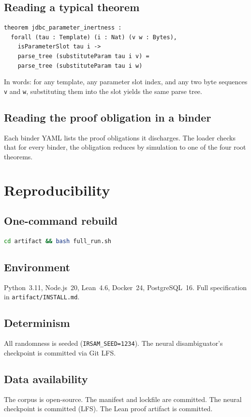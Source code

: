 \documentclass[a4paper,11pt]{report}
\begin{document}
\section{Reading a typical theorem}
\begin{lstlisting}
theorem jdbc_parameter_inertness :
  forall (tau : Template) (i : Nat) (v w : Bytes),
    isParameterSlot tau i ->
    parse_tree (substituteParam tau i v) =
    parse_tree (substituteParam tau i w)
\end{lstlisting}

In words: for any template, any parameter slot index, and any two byte sequences \texttt{v} and \texttt{w}, substituting them into the slot yields the same parse tree.

\section{Reading the proof obligation in a binder}
Each binder YAML lists the proof obligations it discharges. The loader checks that for every binder, the obligation reduces by simulation to one of the four root theorems.

\chapter{Reproducibility}\label{ch:repro}
\section{One-command rebuild}
\begin{lstlisting}[language=bash]
cd artifact && bash full_run.sh
\end{lstlisting}

\section{Environment}
Python~3.11, Node.js~20, Lean~4.6, Docker~24, PostgreSQL~16. Full specification in \texttt{artifact/INSTALL.md}.

\section{Determinism}
All randomness is seeded (\texttt{IRSAM\_SEED=1234}). The neural disambiguator's checkpoint is committed via Git LFS.

\section{Data availability}
The corpus is open-source. The manifest and lockfile are committed. The neural checkpoint is committed (LFS). The Lean proof artifact is committed.
\end{document}
